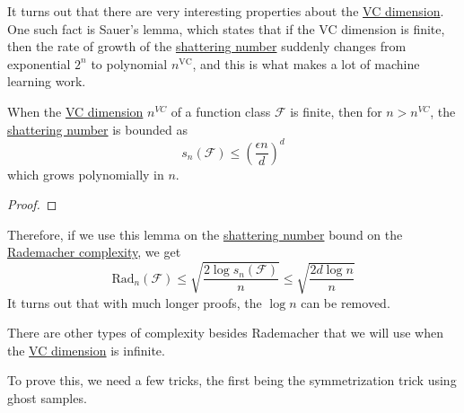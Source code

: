   It turns out that there are very interesting properties about the \hyperref[def:vc-dimension]{VC dimension}. One such fact is Sauer's lemma, which states that if the VC dimension is finite, then the rate of growth of the \hyperref[def:shattering-number]{shattering number} suddenly changes from exponential $2^n$ to polynomial $n^{\mathrm{VC}}$, and this is what makes a lot of machine learning work. 

  \begin{lemma}
    \label{thm:sauer-shelah-lemma}
    When the \hyperref[def:vc-dimension]{VC dimension} $n^{VC}$ of a function class $\mathcal{F}$ is finite, then for $n > n^{VC}$, the \hyperref[def:shattering-number]{shattering number} is bounded as 
    \begin{equation}
      s_n (\mathcal{F}) \leq \left( \frac{\epsilon n}{d} \right)^d
    \end{equation}
    which grows polynomially in $n$. 
  \end{lemma}
  \begin{proof}
    
  \end{proof}

  Therefore, if we use this lemma on the \hyperref[def:shattering-number]{shattering number} bound on the \hyperref[def:rademacher-complexity]{Rademacher complexity}, we get 
  \begin{equation}
    \mathrm{Rad}_n (\mathcal{F}) \leq \sqrt{\frac{2 \log s_n (\mathcal{F})}{n}} \leq \sqrt{\frac{2 d \log{n}}{n}} 
  \end{equation}
  It turns out that with much longer proofs, the $\log{n}$ can be removed. 

  There are other types of complexity besides Rademacher that we will use when the \hyperref[def:vc-dimension]{VC dimension} is infinite. 

  To prove this, we need a few tricks, the first being the symmetrization trick using ghost samples. 

